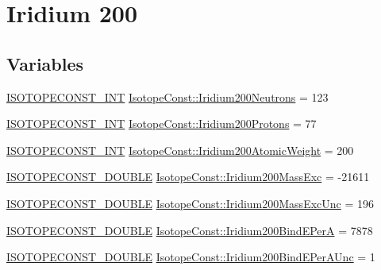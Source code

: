 \hypertarget{group___isotope_const-_iridium-_ir200}{}\section{Iridium 200}
\label{group___isotope_const-_iridium-_ir200}
\subsection*{Variables}
\begin{DoxyCompactItemize}
\item 
\mbox{\hyperlink{group___isotope_const-_macros_ga5f18360b3e99483a35c32d789e62621c}{I\+S\+O\+T\+O\+P\+E\+C\+O\+N\+S\+T\+\_\+\+I\+NT}} \mbox{\hyperlink{group___isotope_const-_iridium-_ir200_ga82b2234386291501da72fd9422797f2b}{Isotope\+Const\+::\+Iridium200\+Neutrons}} = 123
\item 
\mbox{\hyperlink{group___isotope_const-_macros_ga5f18360b3e99483a35c32d789e62621c}{I\+S\+O\+T\+O\+P\+E\+C\+O\+N\+S\+T\+\_\+\+I\+NT}} \mbox{\hyperlink{group___isotope_const-_iridium-_ir200_ga35e519e4aefce8e71cca253f3573f8f6}{Isotope\+Const\+::\+Iridium200\+Protons}} = 77
\item 
\mbox{\hyperlink{group___isotope_const-_macros_ga5f18360b3e99483a35c32d789e62621c}{I\+S\+O\+T\+O\+P\+E\+C\+O\+N\+S\+T\+\_\+\+I\+NT}} \mbox{\hyperlink{group___isotope_const-_iridium-_ir200_ga95f22dd47ea748d22e6c8600291822fa}{Isotope\+Const\+::\+Iridium200\+Atomic\+Weight}} = 200
\item 
\mbox{\hyperlink{group___isotope_const-_macros_ga8f45a7272ce02c0b4c65c44636ed719a}{I\+S\+O\+T\+O\+P\+E\+C\+O\+N\+S\+T\+\_\+\+D\+O\+U\+B\+LE}} \mbox{\hyperlink{group___isotope_const-_iridium-_ir200_ga03ff2a91029f4a57265d7b9890a7b601}{Isotope\+Const\+::\+Iridium200\+Mass\+Exc}} = -\/21611
\item 
\mbox{\hyperlink{group___isotope_const-_macros_ga8f45a7272ce02c0b4c65c44636ed719a}{I\+S\+O\+T\+O\+P\+E\+C\+O\+N\+S\+T\+\_\+\+D\+O\+U\+B\+LE}} \mbox{\hyperlink{group___isotope_const-_iridium-_ir200_ga930f24d6dba2bc7ff631cbbff2ba01f8}{Isotope\+Const\+::\+Iridium200\+Mass\+Exc\+Unc}} = 196
\item 
\mbox{\hyperlink{group___isotope_const-_macros_ga8f45a7272ce02c0b4c65c44636ed719a}{I\+S\+O\+T\+O\+P\+E\+C\+O\+N\+S\+T\+\_\+\+D\+O\+U\+B\+LE}} \mbox{\hyperlink{group___isotope_const-_iridium-_ir200_gae97d7f7b04d15a5150948c993ecd91dd}{Isotope\+Const\+::\+Iridium200\+Bind\+E\+PerA}} = 7878
\item 
\mbox{\hyperlink{group___isotope_const-_macros_ga8f45a7272ce02c0b4c65c44636ed719a}{I\+S\+O\+T\+O\+P\+E\+C\+O\+N\+S\+T\+\_\+\+D\+O\+U\+B\+LE}} \mbox{\hyperlink{group___isotope_const-_iridium-_ir200_ga8d1b06b616568b4be42af9152002e326}{Isotope\+Const\+::\+Iridium200\+Bind\+E\+Per\+A\+Unc}} = 1

\end{DoxyCompactItemize}
